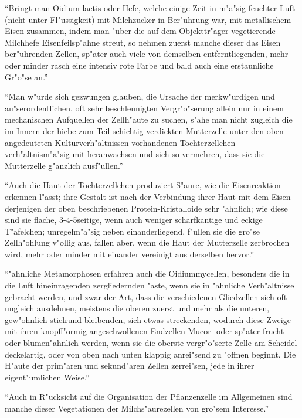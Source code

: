 \documentclass[a4paper, 11pt, oneside]{article}
\begin{document}
"`Bringt man Oidium lactis oder Hefe, welche einige Zeit in m"a"sig feuchter Luft (nicht unter Fl"ussigkeit) mit Milchzucker in Ber"uhrung war, mit metallischem Eisen zusammen, indem man "uber die auf dem Objekttr"ager vegetierende Milchhefe Eisenfeilsp"ahne streut, so nehmen zuerst manche dieser das Eisen ber"uhrenden Zellen, sp"ater auch viele von demselben entferntliegenden, mehr oder minder rasch eine intensiv rote Farbe und bald auch eine erstaunliche Gr"o"se an."'

"`Man w"urde sich gezwungen glauben, die Ursache der merkw"urdigen und au"serordentlichen, oft sehr beschleunigten Vergr"o"serung allein nur in einem mechanischen Aufquellen der Zellh"aute zu suchen, s"ahe man nicht zugleich die im Innern der hiebe zum Teil schichtig verdickten Mutterzelle unter den oben angedeuteten Kulturverh"altnissen vorhandenen Tochterzellchen verh"altnism"a"sig mit heranwachsen und sich so vermehren, dass sie die Mutterzelle g"anzlich ausf"ullen."'

"`Auch die Haut der Tochterzellchen produziert S"aure, wie die Eisenreaktion erkennen l"asst; ihre Gestalt ist nach der Verbindung ihrer Haut mit dem Eisen derjenigen der oben beschriebenen Protein-Kristalloide sehr "ahnlich; wie diese sind sie flache, 3-4-5seitige, wenn auch weniger scharfkantige und eckige T"afelchen; unregelm"a"sig neben einanderliegend, f"ullen sie die gro"se Zellh"ohlung v"ollig aus, fallen aber, wenn die Haut der Mutterzelle zerbrochen wird, mehr oder minder mit einander vereinigt aus derselben hervor."'

"`"ahnliche Metamorphosen erfahren auch die Oidiummycellen, besonders die in die Luft hineinragenden zergliedernden "aste, wenn sie in "ahnliche Verh"altnisse gebracht werden, und zwar der Art, dass die verschiedenen Gliedzellen sich oft ungleich ausdehnen, meistens die oberen zuerst und mehr als die unteren, gew"ohnlich stielrund bleibenden, sich etwas streckenden, wodurch diese Zweige mit ihren knopff"ormig angeschwollenen Endzellen Mucor- oder sp"ater frucht- oder blumen"ahnlich werden, wenn sie die oberste vergr"o"serte Zelle am Scheidel deckelartig, oder von oben nach unten klappig anrei"send zu "offnen beginnt. Die H"aute der prim"aren und sekund"aren Zellen zerrei"sen, jede in ihrer eigent"umlichen Weise."'

"`Auch in R"ucksicht auf die Organisation der Pflanzenzelle im Allgemeinen sind manche dieser Vegetationen der Milchs"aurezellen von gro"sem Interesse."'
\end{document}
